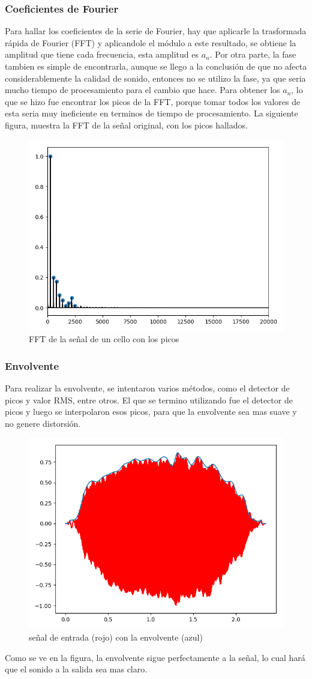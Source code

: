 \documentclass[../ASSD_TP2.tex]{subfiles}
\begin{document}
\subsubsection*{Coeficientes de Fourier}
Para hallar los coeficientes de la serie de Fourier, hay que aplicarle la trasformada r\'apida de Fourier (FFT) y aplicandole el m\'odulo a este resultado, se obtiene la amplitud que tiene cada frecuencia, esta amplitud es $a_n$.
Por otra parte, la fase tambien es simple de encontrarla, aunque se llego a la conclusi\'on de que no afecta considerablemente la calidad de sonido, entonces no se utilizo la fase, ya que seria mucho tiempo de procesamiento para el cambio que hace.
Para obtener los $a_n$, lo que se hizo fue encontrar los picos de la FFT, porque tomar todos los valores de esta seria muy ineficiente en terminos de tiempo de procesamiento.
La siguiente figura, muestra la FFT de la señal original, con los picos hallados.

\begin{figure}[H]
\centering
  \includegraphics[width=0.6\linewidth]{fft_with_peaks.png}
  \caption{FFT de la señal de un cello con los picos}
  \label{fig:fft}
\end{figure}

\subsubsection*{Envolvente}
Para realizar la envolvente, se intentaron varios m\'etodos, como el detector de picos y valor RMS, entre otros. El que se termino utilizando fue el detector de picos y luego se interpolaron esos picos, para que la envolvente sea mas suave y no genere distorsi\'on.
\begin{figure}[H]
\centering
  \includegraphics[width=0.6\linewidth]{envolvente.png}
  \caption{señal de entrada (rojo) con la envolvente (azul)}
  \label{fig:envolvente}
\end{figure}
Como se ve en la figura, la envolvente sigue perfectamente a la señal, lo cual har\'a que el sonido a la salida sea mas claro.
\end{document}
